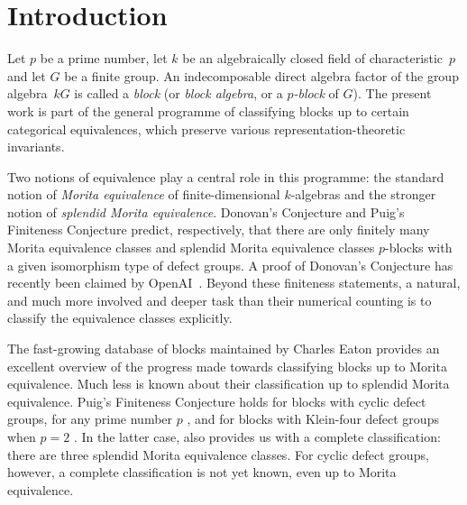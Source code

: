 \documentclass[11pt,a4paper,twoside]{amsart}
\theoremstyle{defnew}
\theoremstyle{remark}
\theoremstyle{plain}
\begin{document}


\section{Introduction}\label{sec:intro}%

Let $p$ be a prime number, let $k$ be an algebraically closed field of characteristic~$p$ and let $G$ be a finite group. An indecomposable direct algebra factor of the group algebra~$kG$ is called a \emph{block} (or \emph{block algebra}, or a \emph{$p$-block} of  $G$). The present work is part of the general programme of classifying blocks up to certain categorical equivalences, which preserve various representation-theoretic invariants.
\par
Two notions of equivalence play a central role in this programme:
the standard notion of \emph{Morita equivalence} of finite-dimensional $k$-algebras and the stronger notion of \emph{splendid Morita equivalence}. 
Donovan's Conjecture and Puig's Finiteness Conjecture predict, respectively, that there are only finitely many Morita equivalence classes and splendid Morita equivalence classes $p$-blocks with a given isomorphism type of defect groups.
A proof of Donovan's Conjecture has recently been claimed by OpenAI~\cite{OpenAIDonovan, OpenAIIntegralDonovan}.
Beyond these finiteness statements, a natural, and much more involved and deeper task than their numerical counting is to classify the equivalence classes explicitly.
\par
The fast-growing database of blocks maintained by Charles Eaton \cite{DATABASE_CHARLES_EATON} provides an excellent overview of the progress made towards classifying blocks up to Morita equivalence.
Much less is known about their classification up to splendid Morita equivalence. Puig’s Finiteness Conjecture  holds for blocks with cyclic defect groups, for any prime number $p$ \cite{LinckCyclic96}, and for blocks with Klein-four defect groups when $p=2$ \cite{CELK11}. 
In the latter case, \cite{CELK11} also provides us with a complete classification: there are three splendid Morita equivalence classes. For cyclic defect groups, however, a complete classification is not yet known, even up to Morita equivalence. 
\end{document}
